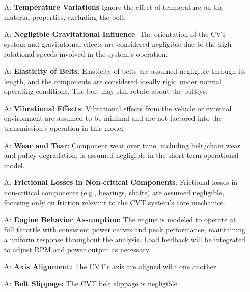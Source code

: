 \documentclass[12pt]{article}
\newcounter{assumpnum} %
\begin{document}
\begin{itemize}

\item[A\refstepcounter{assumpnum}\theassumpnum \label{A_1}:]
\textbf{Temperature Variations} Ignore the effect of temperature on the material properties, excluding the belt.

\item[A\refstepcounter{assumpnum}\theassumpnum \label{A_2}:]
\textbf{Negligible Gravitational Influence}: The orientation of the CVT system and gravitational effects are considered negligible due to the high rotational speeds involved in the system's operation.

\item[A\refstepcounter{assumpnum}\theassumpnum \label{A_3}:]
\textbf{Elasticity of Belts}: Elasticity of belts are assumed negligible through its length, and the components are considered ideally rigid under normal operating conditions. The belt may still rotate about the pulleys.

\item[A\refstepcounter{assumpnum}\theassumpnum \label{A_4}:]
\textbf{Vibrational Effects}: Vibrational effects from the vehicle or external environment are assumed to be minimal and are not factored into the transmission’s operation in this model.

\item[A\refstepcounter{assumpnum}\theassumpnum \label{A_5}:]
\textbf{Wear and Tear}: Component wear over time, including belt/chain wear and pulley degradation, is assumed negligible in the short-term operational model.

\item[A\refstepcounter{assumpnum}\theassumpnum \label{A_6}:]
\textbf{Frictional Losses in Non-critical Components}: Frictional losses in non-critical components (e.g., bearings, shafts) are assumed negligible, focusing only on friction relevant to the CVT system's core mechanics.

\item[A\refstepcounter{assumpnum}\theassumpnum \label{A_7}:]
\textbf{Engine Behavior Assumption:} The engine is modeled to operate at full throttle with consistent power curves and peak performance, maintaining a uniform response throughout the analysis. Load feedback will be integrated to adjust RPM and power output as necessary.

\item[A\refstepcounter{assumpnum}\theassumpnum \label{A_8}:]
\textbf{Axis Alignment:} The CVT's axis are aligned with one another.

\item[A\refstepcounter{assumpnum}\theassumpnum \label{A_9}:]
\textbf{Belt Slippage:} The CVT belt slippage is negligible.

\end{itemize}
\end{document}
